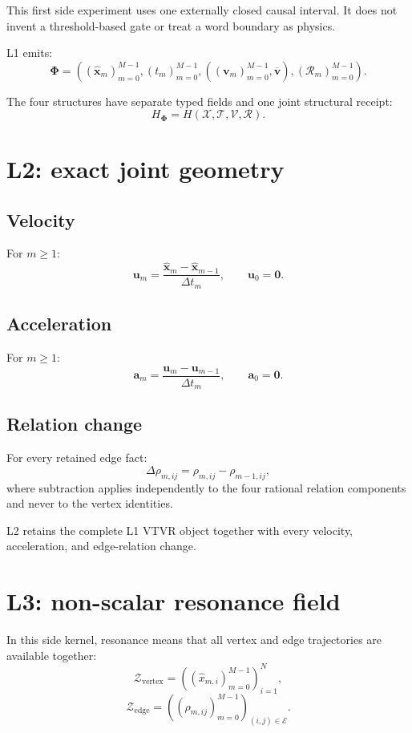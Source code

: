 \documentclass[11pt]{article}
\newcommand{\Xhat}{\widehat{\mathbf{x}}}
\newcommand{\Volume}{\mathcal{V}}
\newcommand{\Relation}{\mathcal{R}}
\newcommand{\VTVR}{\boldsymbol{\Phi}}
\begin{document}
This first side experiment uses one externally closed causal interval. It does
not invent a threshold-based gate or treat a word boundary as physics.

L1 emits:
\[
  \VTVR
  =
  \left(
    (\Xhat_m)_{m=0}^{M-1},
    (t_m)_{m=0}^{M-1},
    ((\mathbf{v}_m)_{m=0}^{M-1},
     \overline{\mathbf{v}}),
    (\Relation_m)_{m=0}^{M-1}
  \right).
\]

The four structures have separate typed fields and one joint structural
receipt:
\[
  H_{\VTVR}=H(\mathcal{X},\mathcal{T},\Volume,\Relation).
\]

\section{L2: exact joint geometry}

\subsection{Velocity}

For \(m\geq1\):
\[
  \mathbf{u}_m
  =
  \frac{\Xhat_m-\Xhat_{m-1}}{\Delta t_m},
\qquad
  \mathbf{u}_0=\mathbf{0}.
\]

\subsection{Acceleration}

For \(m\geq1\):
\[
  \mathbf{a}_m
  =
  \frac{\mathbf{u}_m-\mathbf{u}_{m-1}}
       {\Delta t_m},
\qquad
  \mathbf{a}_0=\mathbf{0}.
\]

\subsection{Relation change}

For every retained edge fact:
\[
  \Delta\rho_{m,ij}
  =
  \rho_{m,ij}-\rho_{m-1,ij},
\]
where subtraction applies independently to the four rational relation
components and never to the vertex identities.

L2 retains the complete L1 VTVR object together with every velocity,
acceleration, and edge-relation change.

\section{L3: non-scalar resonance field}

In this side kernel, resonance means that all vertex and edge trajectories
are available together:
\[
  \mathcal{Z}_{\mathrm{vertex}}
  =
  \left(
    (\widehat{x}_{m,i})_{m=0}^{M-1}
  \right)_{i=1}^{N},
\]
\[
  \mathcal{Z}_{\mathrm{edge}}
  =
  \left(
    (\rho_{m,ij})_{m=0}^{M-1}
  \right)_{(i,j)\in\mathcal{E}}.
\]
\end{document}
